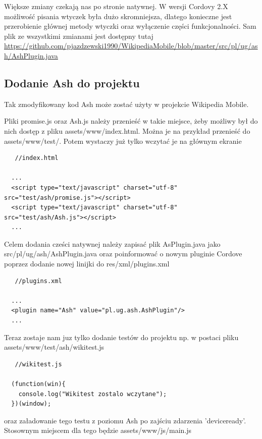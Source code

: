 \documentclass[brudnopis]{xmgr}
\begin{document}
Większe zmiany czekają nas po stronie natywnej. W wersji Cordovy 2.X możliwość pisania wtyczek była dużo skromniejsza, dlatego konieczne jest przerobienie głównej metody wtyczki oraz wyłączenie części funkcjonalności. Sam plik ze wszystkimi zmianami jest dostępny tutaj \url{https://github.com/pjazdzewski1990/WikipediaMobile/blob/master/src/pl/ug/ash/AshPlugin.java}

\subsection{Dodanie Ash do projektu}

Tak zmodyfikowany kod Ash może zostać użyty w projekcie Wikipedia Mobile.

Pliki promise.js oraz Ash.js należy przenieść w takie miejsce, żeby możliwy był do nich dostęp z pliku assets/www/index.html. Można je na przykład przenieść do assets/www/test/. Potem wystaczy już tylko wczytać je na głównym ekranie 

\begin{lstlisting}
   //index.html
  
  ...
  <script type="text/javascript" charset="utf-8" src="test/ash/promise.js"></script>
  <script type="text/javascript" charset="utf-8" src="test/ash/Ash.js"></script>
  ...
\end{lstlisting}

Celem dodania cześci natywnej należy zapisać plik AsPlugin.java jako src/pl/ug/ash/AshPlugin.java oraz poinformować o nowym pluginie Cordove poprzez dodanie nowej linijki do res/xml/plugins.xml

\begin{lstlisting}
   //plugins.xml
  
  ...
  <plugin name="Ash" value="pl.ug.ash.AshPlugin"/>
  ...

\end{lstlisting}

Teraz zostaje nam juz tylko dodanie testów do projektu np. w postaci pliku  assets/www/test/ash/wikitest.js 

\begin{lstlisting}
   //wikitest.js

  (function(win){  
    console.log("Wikitest zostalo wczytane");
  })(window);
\end{lstlisting}

oraz załadowanie tego testu z poziomu Ash po zajściu zdarzenia 'deviceready'. Stosownym miejscem dla tego będzie assets/www/js/main.js
\end{document}

